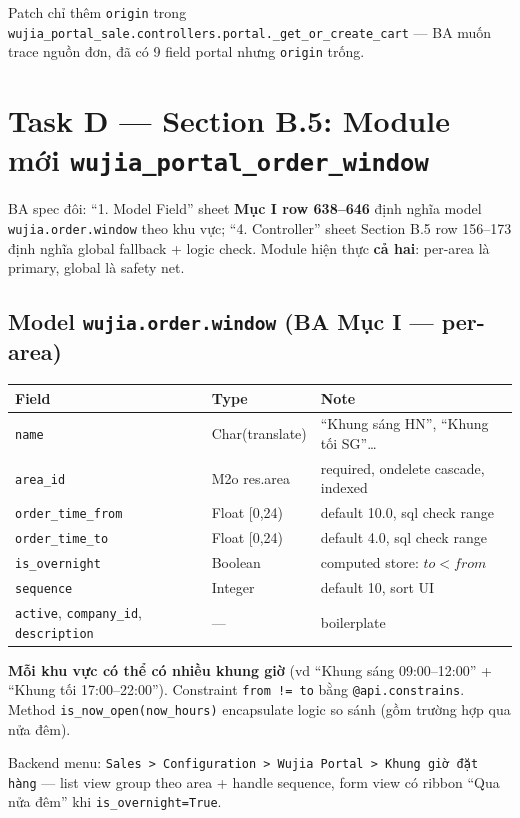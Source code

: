 Patch chỉ thêm \texttt{origin} trong
\texttt{wujia\_portal\_sale.controllers.portal.\_get\_or\_create\_cart} --- BA muốn
trace nguồn đơn, đã có 9 field portal nhưng \texttt{origin} trống.

\section{Task D --- Section B.5: Module mới \texttt{wujia\_portal\_order\_window}}

BA spec đôi: ``1. Model Field'' sheet \textbf{Mục I row 638--646} định nghĩa
model \texttt{wujia.order.window} theo khu vực; ``4. Controller'' sheet
Section B.5 row 156--173 định nghĩa global fallback + logic check. Module
hiện thực \textbf{cả hai}: per-area là primary, global là safety net.

\subsection{Model \texttt{wujia.order.window} (BA Mục I --- per-area)}

\begin{tabular}{lll}
\toprule
\textbf{Field} & \textbf{Type} & \textbf{Note} \\
\midrule
\texttt{name} & Char(translate) & ``Khung sáng HN'', ``Khung tối SG''\ldots \\
\texttt{area\_id} & M2o res.area & required, ondelete cascade, indexed \\
\texttt{order\_time\_from} & Float [0,24) & default 10.0, sql check range \\
\texttt{order\_time\_to} & Float [0,24) & default 4.0, sql check range \\
\texttt{is\_overnight} & Boolean & computed store: \(to < from\) \\
\texttt{sequence} & Integer & default 10, sort UI \\
\texttt{active}, \texttt{company\_id}, \texttt{description} & --- & boilerplate \\
\bottomrule
\end{tabular}

\textbf{Mỗi khu vực có thể có nhiều khung giờ} (vd ``Khung sáng 09:00--12:00''
+ ``Khung tối 17:00--22:00''). Constraint \texttt{from != to} bằng
\texttt{@api.constrains}. Method \texttt{is\_now\_open(now\_hours)} encapsulate
logic so sánh (gồm trường hợp qua nửa đêm).

Backend menu: \texttt{Sales > Configuration > Wujia Portal > Khung giờ đặt hàng}
--- list view group theo area + handle sequence, form view có ribbon
``Qua nửa đêm'' khi \texttt{is\_overnight=True}.

